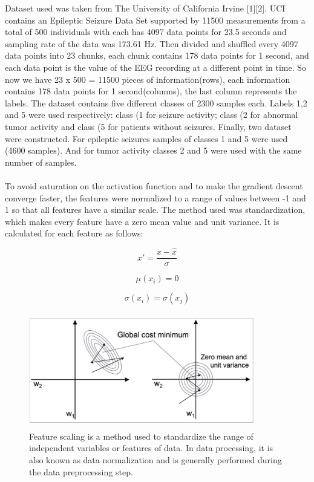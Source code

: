 \documentclass{llncs}       %
\begin{document}
Dataset used was taken from The University of California Irvine [1][2].  UCI contains an Epileptic Seizure Data Set supported by 11500 measurements from a total of 500 individuals with each has 4097 data points for 23.5 seconds and sampling rate of the data was 173.61 Hz. Then divided and shuffled every 4097 data points into 23 chunks, each chunk contains 178 data points for 1 second, and each data point is the value of the EEG recording at a different point in time. So now we have 23 x 500 = 11500 pieces of information(rows), each information contains 178 data points for 1 second(columns), the last column represents the labels.  The dataset contains five different classes of 2300 samples each. Labels 1,2 and 5 were used respectively: class (1 for seizure activity; class (2 for abnormal tumor activity and class (5 for patients without seizures.  Finally, two dataset were constructed.   For epileptic seizures samples of classes 1 and 5 were used (4600 samples).  And for tumor  activity classes 2 and 5 were used with the same number of samples.
   
\paragraph{}

To avoid saturation on the activation function and to make the gradient descent converge faster, the features were normalized to a range of values between -1 and 1 so that all features have a similar scale. The method used was standardization, which makes every feature have a zero mean value and unit variance. It is calculated for each feature as follows:


\begin{equation} 
x'=\frac{x-\hat{x}}{\sigma}
\end{equation}

\begin{equation}
\mu (x_{i})= 0   
\end{equation}

\begin{equation} 
\sigma (x_{i}) = \sigma(x_{j})
\end{equation}


\begin{figure}[h]
\centering
\includegraphics[width=9.81cm,height=5.00cm]{media/image7.eps}
\caption{Feature scaling is a method used to standardize the 
range of independent variables or features of data. In data processing, 
it is also known as data normalization and is generally performed during 
the data preprocessing step.}
\end{figure}
\end{document}
